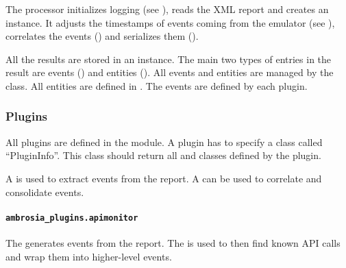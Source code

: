 \documentclass[letterpaper,10pt,english]{sphinxmanual}
\begin{document}
The processor initializes logging (see {\hyperref[ambrosia.util:ambrosia.util.log.init_logging]{}}), reads the XML report and creates an
{\hyperref[ambrosia:ambrosia.Ambrosia]{}} instance. It adjusts the timestamps of events coming from the emulator (see
{\hyperref[ambrosia:ambrosia.Ambrosia.adjust_times]{}}), correlates the events ({\hyperref[ambrosia:ambrosia.Ambrosia.correlate]{}}) and serializes
them ({\hyperref[ambrosia:ambrosia.Ambrosia.serialize]{}}).

All the results are stored in an {\hyperref[ambrosia.model:ambrosia.model.Analysis]{}} instance. The main two types of entries in the result
are events ({\hyperref[ambrosia.model:ambrosia.model.Event]{}}) and entities ({\hyperref[ambrosia.model:ambrosia.model.Entity]{}}). All events and entities
are managed by the {\hyperref[ambrosia.model:ambrosia.model.Analysis]{}} class. All entities are defined in {\hyperref[ambrosia.model:module-ambrosia.model.entities]{}}.
The events are defined by each plugin.


\subsubsection{Plugins}
\label{server:plugins}
All plugins are defined in the {\hyperref[ambrosia_plugins:module-ambrosia_plugins]{}} module. A plugin has to specify a
{\hyperref[ambrosia.plugins:ambrosia.plugins.PluginInfoTop]{}} class called ``PluginInfo''. This class should return all
{\hyperref[ambrosia:ambrosia.Correlator]{}} and {\hyperref[ambrosia:ambrosia.ResultParser]{}} classes defined by the plugin.

A {\hyperref[ambrosia:ambrosia.ResultParser]{}} is used to extract events from the report. A {\hyperref[ambrosia:ambrosia.Correlator]{}} can be used
to correlate and consolidate events.


\paragraph{\texttt{ambrosia\_plugins.apimonitor}}
\label{server:ambrosia-plugins-apimonitor}
The {\hyperref[ambrosia_plugins.apimonitor:ambrosia_plugins.apimonitor.ApimonitorPluginParser]{}} generates events from the report. The
{\hyperref[ambrosia_plugins.apimonitor:ambrosia_plugins.apimonitor.ApiCallCorrelator]{}} is used to then find known API calls and wrap them into
higher-level events.
\end{document}

